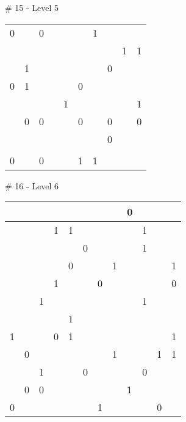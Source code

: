 \medskip

\# 15 - Level 5 \newline
\begin{tabular}{|m{\collen}|m{\collen}|m{\collen}|m{\collen}|m{\collen}|m{\collen}|m{\collen}|m{\collen}|m{\collen}|m{\collen}|}
\hline
    &   &   &   &   &   &   &   &   &   \\
\hline
  0 &   & 0 &   &   &   & 1 &   &   &   \\
\hline
    &   &   &   &   &   &   &   & 1 & 1 \\
\hline
    & 1 &   &   &   &   &   & 0 &   &   \\
\hline
  0 & 1 &   &   &   & 0 &   &   &   &   \\
\hline
    &   &   &   & 1 &   &   &   &   & 1 \\
\hline
    & 0 & 0 &   &   & 0 &   & 0 &   & 0 \\
\hline
    &   &   &   &   &   &   & 0 &   &   \\
\hline
    &   &   &   &   &   &   &   &   &   \\
\hline
  0 &   & 0 &   &   & 1 & 1 &   &   &   \\
\hline
\end{tabular}


\medskip

\# 16 - Level 6 \newline
\begin{tabular}{|m{\collen}|m{\collen}|m{\collen}|m{\collen}|m{\collen}|m{\collen}|m{\collen}|m{\collen}|m{\collen}|m{\collen}|m{\collen}|m{\collen}|}
\hline
    &   &   &   &   &   &   &   & 0 &   &   &   \\
\hline
    &   &   & 1 & 1 &   &   &   &   & 1 &   &   \\
\hline
    &   &   &   &   & 0 &   &   &   & 1 &   &   \\
\hline
    &   &   &   & 0 &   &   & 1 &   &   &   & 1 \\
\hline
    &   &   & 1 &   &   & 0 &   &   &   &   & 0 \\
\hline
    &   & 1 &   &   &   &   &   &   & 1 &   &   \\
\hline
    &   &   &   & 1 &   &   &   &   &   &   &   \\
\hline
  1 &   &   & 0 & 1 &   &   &   &   &   &   & 1 \\
\hline
    & 0 &   &   &   &   &   & 1 &   &   & 1 & 1 \\
\hline
    &   & 1 &   &   & 0 &   &   &   & 0 &   &   \\
\hline
    & 0 & 0 &   &   &   &   &   & 1 &   &   &   \\
\hline
  0 &   &   &   &   &   & 1 &   &   &   & 0 &   \\
\hline
\end{tabular}


